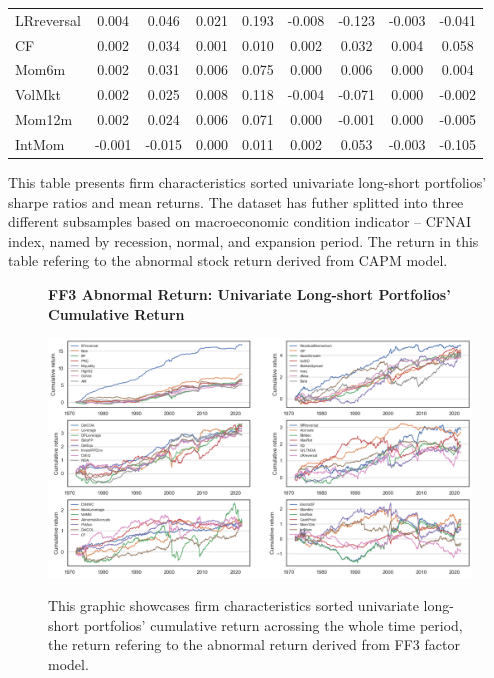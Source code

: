 \begin{table}[H]
\begin{tabular}{lcc|cc|cc|cc}
      LRreversal & 0.004 & 0.046 & 0.021 & 0.193 & -0.008 & -0.123 & -0.003 & -0.041 \\ 
      CF & 0.002 & 0.034 & 0.001 & 0.010 & 0.002 & 0.032 & 0.004 & 0.058 \\ 
      Mom6m & 0.002 & 0.031 & 0.006 & 0.075 & 0.000 & 0.006 & 0.000 & 0.004 \\ 
      VolMkt & 0.002 & 0.025 & 0.008 & 0.118 & -0.004 & -0.071 & 0.000 & -0.002 \\ 
      Mom12m & 0.002 & 0.024 & 0.006 & 0.071 & 0.000 & -0.001 & 0.000 & -0.005 \\ 
      IntMom & -0.001 & -0.015 & 0.000 & 0.011 & 0.002 & 0.053 & -0.003 & -0.105 \\ \hline
  \end{tabular}
  \begin{tablenotes}
    \footnotesize
    \item This table presents firm characteristics sorted univariate long-short portfolios' sharpe ratios and mean returns. The dataset has futher splitted into three different subsamples based on macroeconomic condition indicator -- CFNAI index, named by recession, normal, and expansion period. The return in this table refering to the abnormal stock return derived from CAPM model.
  \end{tablenotes}
\end{table}

\begin{figure}[H]
  \centering
  \caption{\textbf{FF3 Abnormal Return: Univariate Long-short Portfolios' Cumulative Return}}
  \includegraphics[width=.8\textwidth]{images/univariate_ls_cum_ret_ff3.png}
  \label{fig: ff3 univariate ls cumulative return}
  \caption*{\footnotesize{This graphic showcases firm characteristics sorted univariate long-short portfolios' cumulative return acrossing the whole time period, the return refering to the abnormal return derived from FF3 factor model.}}
\end{figure}

